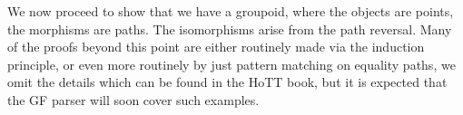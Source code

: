 We now proceed to show that we have a groupoid, where the objects are points,
the morphisms are paths. The isomorphisms arise from the path reversal.  Many
of the proofs beyond this point are either routinely made via the induction
principle, or even more routinely by just pattern matching on equality paths,
we omit the details which can be found in the HoTT book, but it is expected
that the GF parser will soon cover such examples.

\begin{code}%
%
\>[2]\AgdaSpace{}%
\AgdaSymbol{:}\AgdaSpace{}%
\AgdaSymbol{\{}\AgdaSpace{}%
\AgdaSymbol{:}\AgdaSpace{}%
\AgdaSymbol{\}}\AgdaSpace{}%
\AgdaSymbol{\{}\AgdaSpace{}%
\AgdaSpace{}%
\AgdaSymbol{:}\AgdaSpace{}%
\AgdaSymbol{\}}\AgdaSpace{}%
\AgdaSymbol{(}\AgdaSpace{}%
\AgdaSymbol{:}\AgdaSpace{}%
\AgdaSpace{}%
\AgdaSpace{}%
\AgdaSymbol{)}\AgdaSpace{}%
\AgdaSpace{}%
\AgdaSpace{}%
\AgdaSpace{}%
\AgdaSpace{}%
\AgdaSpace{}%
\<%
\\
%
\>[2]\AgdaSpace{}%
\AgdaSymbol{\{}\AgdaSymbol{\}}\AgdaSpace{}%
\AgdaSymbol{\{}\AgdaSymbol{\}}\AgdaSpace{}%
\AgdaSymbol{\{}\AgdaSymbol{\}}\AgdaSpace{}%
\AgdaSpace{}%
\AgdaSymbol{=}\AgdaSpace{}%
\AgdaSpace{}%
\AgdaSpace{}%
\AgdaSpace{}%
\AgdaSpace{}%
\AgdaSpace{}%
\<%
\\
\>[2][@{}l@{\AgdaIndent{0}}]%
\>[4]\<%
\\
\>[4][@{}l@{\AgdaIndent{0}}]%
\>[6]\AgdaSpace{}%
\AgdaSymbol{:}\AgdaSpace{}%
\AgdaSymbol{(}\AgdaSpace{}%
\AgdaSpace{}%
\AgdaSymbol{:}\AgdaSpace{}%
\AgdaSymbol{)}\AgdaSpace{}%
\AgdaSpace{}%
\AgdaSpace{}%
\AgdaSpace{}%
\AgdaSpace{}%
\AgdaSpace{}%
\<%
\\
%
\>[6]\AgdaSpace{}%
\AgdaSpace{}%
\AgdaSpace{}%
\AgdaSpace{}%
\AgdaSymbol{=}\AgdaSpace{}%
\AgdaSpace{}%
\AgdaSpace{}%
\AgdaSpace{}%
\AgdaSpace{}%

\end{code}
